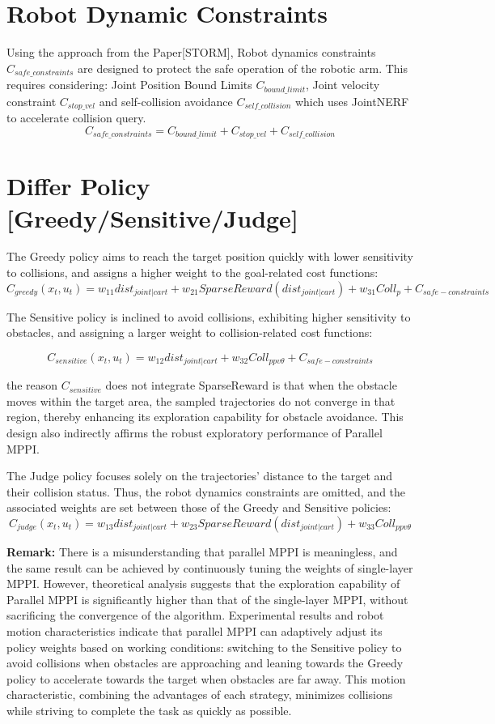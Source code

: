 \documentclass{article}
\begin{document}
	
\section{Robot Dynamic Constraints}

Using the approach from the Paper[STORM], Robot dynamics constraints $C_{safe\_constraints}$ are designed to protect the safe operation of the robotic arm. This requires considering: Joint Position Bound Limits $C_{bound\_limit}$, Joint velocity constraint $C_{stop\_vel}$ and self-collision avoidance $C_{self\_collision}$ which uses JointNERF to  accelerate collision query. 
\[C_{safe\_constraints} = C_{bound\_limit} + C_{stop\_vel} + C_{self\_collision} \tag{4} \]

\section{Differ Policy [Greedy/Sensitive/Judge]}
The  Greedy policy aims to reach the target position quickly with  lower sensitivity to collisions, and assigns a higher weight to the goal-related cost functions:
\[{C_{greedy}}({x_t},{u_t})={w_{11}}dis{t_{joint|cart}}+ {w_{21}}SparseReward(dis{t_{joint|cart}}) + {w_{31}}Col{l_p} + {C_{safe - constraints}}\]

The Sensitive policy is inclined to avoid collisions, exhibiting higher sensitivity to obstacles, and assigning a larger weight to collision-related cost functions:

\[{C_{sensitive}}({x_t},{u_t}) = {w_{12}}dis{t_{joint|cart}} + {w_{32}}Col{l_{ppv\theta }} + {C_{safe - constraints}}\]

the reason  $C_{sensitive}$ does not integrate SparseReward is that when the obstacle moves within the target area, the sampled trajectories do not converge in that region, thereby enhancing its exploration capability for obstacle avoidance. This design also indirectly affirms the robust exploratory performance of Parallel MPPI.

The Judge policy focuses solely on the trajectories' distance to the target and their collision status. Thus, the robot dynamics constraints are omitted, and the associated weights are set between those of the Greedy and Sensitive policies:
\[{C_{judge}}({x_t},{u_t}) = {w_{13}}dis{t_{joint|cart}} + {w_{23}}SparseReward(dis{t_{joint|cart}}) + {w_{33}}Col{l_{ppv\theta }}\]

\textbf{Remark:} There is a misunderstanding that parallel MPPI is meaningless, and the same result can be achieved by continuously tuning the weights of single-layer MPPI.
However, theoretical analysis suggests that the exploration capability of Parallel MPPI  is significantly higher than that of the single-layer MPPI, without sacrificing the convergence of the algorithm. Experimental results and robot motion characteristics indicate that parallel MPPI can adaptively adjust its policy weights based on working conditions: switching to the Sensitive policy to avoid collisions when obstacles are approaching and leaning towards the Greedy policy to accelerate towards the target when obstacles are far away. This motion characteristic, combining the advantages of each strategy, minimizes collisions while striving to complete the task as quickly as possible.
\end{document}
